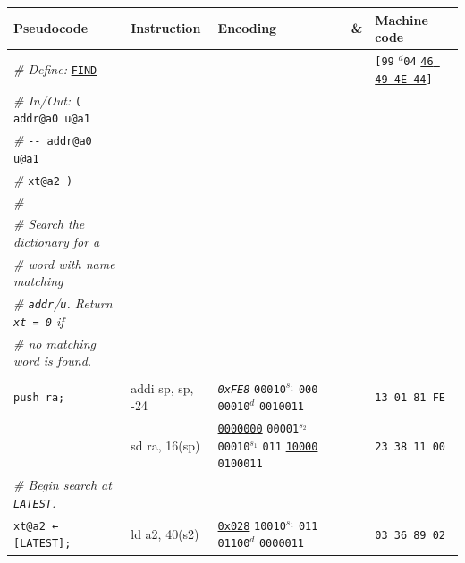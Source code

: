 \documentclass[a4paper,12pt,final]{article}
\begin{document}
\begin{table}[!htbp] \begin{adjustwidth}{-1cm}{-1cm} \fontsize{8}{9.600000}\selectfont
\begin{center}
\begin{tabular}{l|ll|l|l}
\textbf{Pseudocode} & \textbf{Instruction} & \textbf{Encoding} & \textbf{\&} & \textbf{Machine code}\\[0pt]
\hline
\emph{\# Define:} \uline{\texttt{FIND}} & --- & --- &  & \texttt{[99} \(^{d}\)​\texttt{04} \uline{\texttt{46 49 4E 44}}​\texttt{]}\\[0pt]
\emph{\# In/Out:}    \texttt{( addr@a0 u@a1} &  &  &  & \\[0pt]
\emph{\#}\hspace{3.35em} \texttt{-{}-{} addr@a0 u@a1} &  &  &  & \\[0pt]
\emph{\#}\hspace{4.9em}      \texttt{xt@a2 )} &  &  &  & \\[0pt]
\emph{\#} &  &  &  & \\[0pt]
\emph{\# Search the dictionary for a} &  &  &  & \\[0pt]
\emph{\# word with name matching} &  &  &  & \\[0pt]
\emph{\# \texttt{addr}​/​\texttt{u}. Return \texttt{xt = 0} if} &  &  &  & \\[0pt]
\emph{\# no matching word is found.} &  &  &  & \\[0pt]
 &  &  &  & \\[0pt]
\hspace{1.053000em} \texttt{push ra;} & addi sp, sp, -24 & \emph{\texttt{0xFE8}}                    \texttt{00010}​\(^{s_{1}}\) \texttt{000} \texttt{00010}​\(^{d}\)  \texttt{0010011} &  & \texttt{13 01 81 FE}\\[0pt]
\hspace{1.053000em} & sd ra, 16(sp) & \uline{\texttt{0000000}} \texttt{00001}​\(^{s_{2}}\) \texttt{00010}​\(^{s_{1}}\) \texttt{011} \uline{\texttt{10000}} \texttt{0100011} &  & \texttt{23 38 11 00}\\[0pt]
\hspace{1.053000em} \emph{\# Begin search at \texttt{LATEST}.} &  &  &  & \\[0pt]
\hspace{1.053000em} \texttt{xt@a2 ← [LATEST];} & ld a2, 40(s2) & \uline{\texttt{0x028}}                    \texttt{10010}​\(^{s_{1}}\) \texttt{011} \texttt{01100}​\(^{d}\)  \texttt{0000011} &  & \texttt{03 36 89 02}\\[0pt]

\end{tabular}
\end{center}
\end{adjustwidth}
\end{table}
\end{document}
